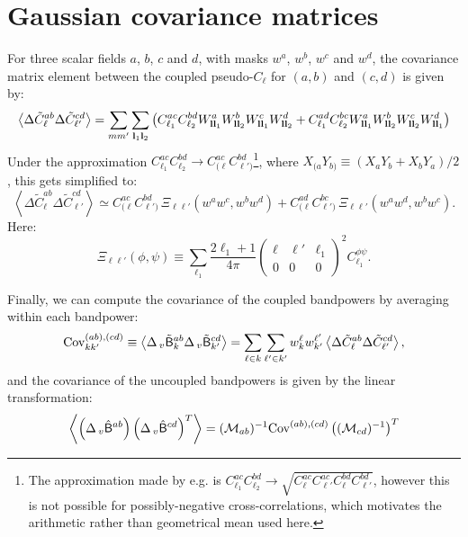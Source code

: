 \documentclass[a4paper,10pt]{article}
\newcommand{\wtj}[6]{\left(\begin{array}{ccc} #1 & #2 & #3\\#4 & #5 & #6\end{array} \right)}
\begin{document}
\section{Gaussian covariance matrices}
  For three scalar fields $a$, $b$, $c$ and $d$, with masks $w^a$, $w^b$, $w^c$ and $w^d$, the covariance matrix element between the coupled pseudo-$C_\ell$ for $(a,b)$ and $(c,d)$ is given by:
  \begin{equation}
    \left\langle\Delta\tilde{C}^{ab}_\ell\Delta\tilde{C}^{cd}_{\ell'}\right\rangle=\sum_{mm'}\sum_{{\bf l}_1{\bf l}_2}\left(C^{ac}_{\ell_1}C^{bd}_{\ell_2}W^a_{{\bf l}{\bf l}_1}W^b_{{\bf l}{\bf l}_2}W^c_{{\bf l}{\bf l}_1}W^d_{{\bf l}{\bf l}_2}+C^{ad}_{\ell_1}C^{bc}_{\ell_2}W^a_{{\bf l}{\bf l}_1}W^b_{{\bf l}{\bf l}_2}W^c_{{\bf l}{\bf l}_2}W^d_{{\bf l}{\bf l}_1}\right)
  \end{equation}
  Under the approximation $C^{ac}_{\ell_1}C^{bd}_{\ell_2}\rightarrow C^{ac}_{(\ell}C^{bd}_{\ell')}$\footnote{The approximation made by e.g. \cite{2004MNRAS.349..603E,2005MNRAS.360.1262B} is $C^{ac}_{\ell_1}C^{bd}_{\ell_2}\rightarrow \sqrt{C^{ac}_{\ell}C^{ac}_{\ell'}C^{bd}_{\ell}C^{bd}_{\ell'}}$, however this is not possible for possibly-negative cross-correlations, which motivates the arithmetic rather than geometrical mean used here.}, where $X_{(a}Y_{b)}\equiv(X_aY_b+X_bY_a)/2$, this gets simplified to:
  \begin{equation}
    \left\langle\Delta\tilde{C}^{ab}_\ell\Delta\tilde{C}^{cd}_{\ell'}\right\rangle\simeq
    C^{ac}_{(\ell}C^{bd}_{\ell')}\,\Xi_{\ell\ell'}(w^aw^c,w^bw^d)+C^{ad}_{(\ell}C^{bc}_{\ell')}\,\Xi_{\ell\ell'}(w^aw^d,w^bw^c).
  \end{equation}
  Here:
  \begin{equation}
    \Xi_{\ell\ell'}(\phi,\psi)\equiv\sum_{\ell_1}\frac{2\ell_1+1}{4\pi}\wtj{\ell}{\ell'}{\ell_1}{0}{0}{0}^2C^{\phi\psi}_{\ell_1}.
  \end{equation}
  
  Finally, we can compute the covariance of the coupled bandpowers by averaging within each bandpower:
  \begin{equation}
    {\rm Cov}^{(ab),(cd)}_{kk'}\equiv\left\langle\Delta\,_v\tilde{\sf B}^{ab}_k\Delta\,_v\tilde{\sf B}^{cd}_{k'}\right\rangle=\sum_{\ell\in k}\sum_{\ell'\in k'}w_k^\ell w_{k'}^{\ell'}\left\langle\Delta\tilde{C}^{ab}_\ell\Delta\tilde{C}^{cd}_{\ell'}\right\rangle,
  \end{equation}
  and the covariance of the uncoupled bandpowers is given by the linear transformation:
  \begin{equation}
    \left\langle\left(\Delta\,_v\hat{\sf B}^{ab}\right)\left(\Delta\,_v\hat{\sf B}^{cd}\right)^T\right\rangle=({\cal M}_{ab})^{-1}{\rm Cov}^{(ab),(cd)}\left(({\cal M}_{cd})^{-1}\right)^T
  \end{equation}
\end{document}
